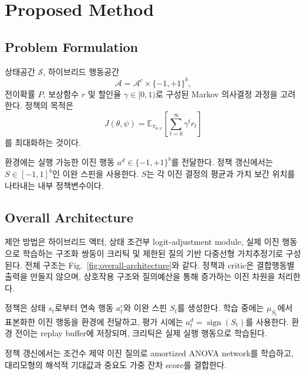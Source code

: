 \documentclass[10pt,journal]{IEEEtran}
\newcommand{\E}{\mathbb{E}}
\newcommand{\A}{\mathcal{A}}
\newcommand{\Sset}{\mathcal{S}}
\begin{document}
\section{Proposed Method}
\label{sec:method}

\subsection{Problem Formulation}

상태공간 $\Sset$, 하이브리드 행동공간
\begin{equation}
\A=\A^c\times\{-1,+1\}^b,
\end{equation}
전이확률 $P$, 보상함수 $r$ 및 할인율
$\gamma\in[0,1)$로 구성된 Markov 의사결정 과정을 고려한다. 정책의 목적은
\begin{equation}
J(\theta,\psi)
=
\E_{\pi_{\theta,\psi}}
\left[
\sum_{t=0}^{\infty}\gamma^t r_t
\right]
\label{eq:rl-objective}
\end{equation}
를 최대화하는 것이다.

환경에는 실행 가능한 이진 행동
$a^d\in\{-1,+1\}^b$를 전달한다. 정책 갱신에서는
$S\in[-1,1]^b$인 이완 스핀을 사용한다. $S$는 각 이진 결정의 평균과 가치 보간 위치를 나타내는 내부 정책변수이다.


\subsection{Overall Architecture}

제안 방법은 하이브리드 액터, 상태 조건부 logit-adjustment module, 실제 이진 행동으로 학습하는 구조화 쌍둥이 크리틱 및 제한된 질의 기반 다중선형 가치추정기로 구성된다. 전체 구조는 Fig.~\ref{fig:overall-architecture}와 같다. 정책과 critic은 결합행동별 출력을 만들지 않으며, 상호작용 구조와 질의예산을 통해 증가하는 이진 차원을 처리한다.

정책은 상태 $s_t$로부터 연속 행동 $a_t^c$와 이완 스핀 $S_t$를 생성한다. 학습 중에는 $\mu_{S_t}$에서 표본화한 이진 행동을 환경에 전달하고, 평가 시에는 $a_t^d=\operatorname{sign}(S_t)$를 사용한다. 환경 전이는 replay buffer에 저장되며, 크리틱은 실제 실행 행동으로 학습된다.

정책 갱신에서는 조건수 제약 이진 질의로 amortized ANOVA network를 학습하고, 대리모형의 해석적 기대값과 중요도 가중 잔차 score를 결합한다.
\end{document}
